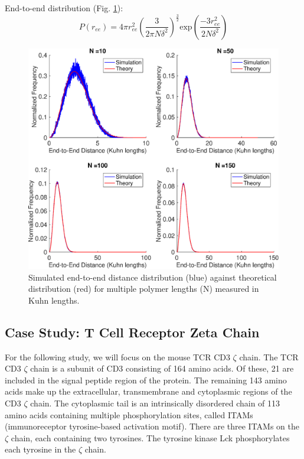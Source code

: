 \documentclass[../AdvancementSummary.tex]{subfiles}
\begin{document}
End-to-end distribution \cite{VanValen2009, Reeves2011} (Fig. \ref{fig: ReeDist}):
\begin{equation*}
P(r_{ee}) = 4\pi r_{ee}^2 \left( \frac{3}{2\pi N \delta^2}\right)^{\frac{3}{2}}\text{exp}\left(\frac{-3r_{ee}^2}{2N \delta^2}\right)
\end{equation*}

\begin{figure}
\begin{center}
\includegraphics[width=0.8\linewidth]{ModelConfirmationFigures/ReeDistribution.eps}
\caption{Simulated end-to-end distance distribution (blue) against theoretical distribution (red) for multiple polymer lengths (N) measured in Kuhn lengths. \label{fig: ReeDist}}
\end{center}
\end{figure}


\subsection{Case Study: T Cell Receptor Zeta Chain}
\label{sec:ModelDevsubsec:TCR}
For the following study, we will focus on the mouse TCR CD3 $\zeta$ chain. The TCR CD3 $\zeta$ chain is a subunit of CD3 consisting of 164 amino acids. Of these, 21 are included in the signal peptide region of the protein. The remaining 143 amino acids make up the extracellular, transmembrane and cytoplasmic regions of the CD3 $\zeta$ chain. The cytoplasmic tail is an intrinsically disordered chain of 113 amino acids containing multiple phosphorylation sites, called ITAMs (immunoreceptor tyrosine-based activation motif). There are three ITAMs on the $\zeta$ chain, each containing two tyrosines. The tyrosine kinase Lck phosphorylates each tyrosine in the $\zeta$ chain. 
\end{document}
